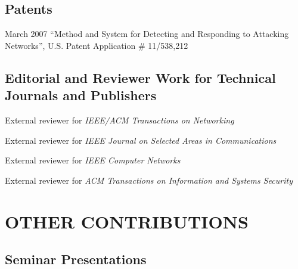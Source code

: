 \subsection{Patents}

\begin{cvlist}{}
\item[March 2007] ``Method and System for Detecting and Responding to Attacking
  Networks'', U.S. Patent Application \# 11/538,212 
\end{cvlist}

\subsection{Editorial and Reviewer Work for Technical Journals and Publishers}
\label{subsec:editorial}

\begin{cvlist}{}
\item External reviewer for {\em IEEE/ACM Transactions on Networking}
\item External reviewer for {\em IEEE Journal on Selected Areas in
  Communications} 
\item External reviewer for {\em IEEE Computer Networks}
\item External reviewer for {\em ACM Transactions on Information and
  Systems Security}
\end{cvlist}


\section{OTHER CONTRIBUTIONS}
\label{sec:other}

\subsection{Seminar Presentations}
\label{subsec:seminar}


